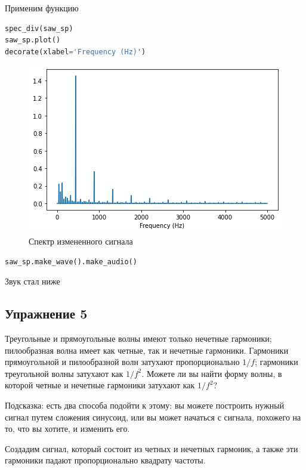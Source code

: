 Применим функцию

\begin{lstlisting}[language=Python]
spec_div(saw_sp)
saw_sp.plot()
decorate(xlabel='Frequency (Hz)')
\end{lstlisting}

\begin{figure}[H]
	\begin{center}
		\includegraphics[scale=1]{fig/lab02/lab02_11.png}
		\caption{Спектр измененного сигнала}
	\end{center}
\end{figure}

\begin{lstlisting}[language=Python]
saw_sp.make_wave().make_audio()
\end{lstlisting}

Звук стал ниже


\subsection{Упражнение 5}

Треугольные и прямоугольные волны имеют только нечетные гармоники; пилообразная волна имеет как четные, так и нечетные гармоники. Гармоники прямоугольной и пилообразной волн затухают пропорционально $1/f$; гармоники треугольной волны затухают как $1/f^2$. Можете ли вы найти форму волны, в которой четные и нечетные гармоники затухают как $1/f^2$?

\noindent Подсказка: есть два способа подойти к этому: вы можете построить нужный сигнал путем сложения синусоид, или вы может начаться с сигнала, похожего на то, что вы хотите, и изменить его.

Создадим сигнал, который состоит из четных и нечетных гармоник, а также эти гармоники падают пропорционально квадрату частоты.

